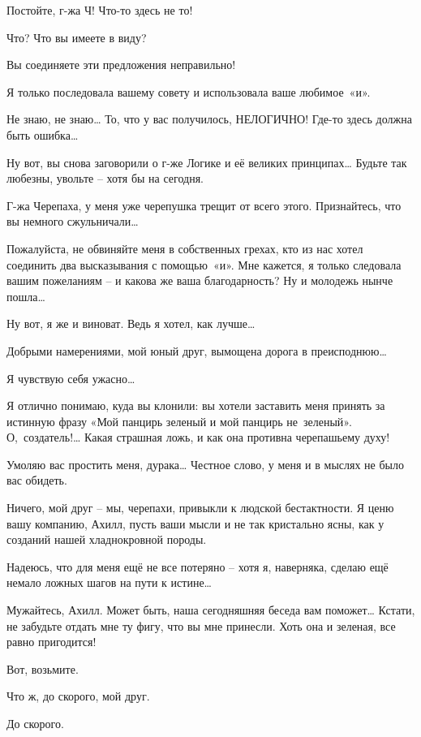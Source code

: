 \documentclass[../main.tex]{subfiles}
\begin{document}
\begin{dialogue}
 Постойте, г-жа Ч! Что-то здесь не то!

 Что? Что вы имеете в виду?

 Вы соединяете эти предложения неправильно!

 Я только последовала вашему совету и использовала ваше любимое~«и».

 Не знаю, не знаю\ldots{} То, что у вас получилось, НЕЛОГИЧНО! Где-то здесь должна быть ошибка\ldots{}

 Ну вот, вы снова заговорили о г-же Логике и её великих принципах\ldots{} Будьте так любезны, увольте \--- хотя бы на сегодня.

 Г-жа Черепаха, у меня уже черепушка трещит от всего этого. Признайтесь, что вы немного сжульничали\ldots{}

 Пожалуйста, не обвиняйте меня в собственных грехах, кто из нас хотел соединить два высказывания с помощью~«и». Мне кажется, я только следовала вашим пожеланиям \--- и какова же ваша благодарность? Ну и молодежь нынче пошла\ldots{}

 Ну вот, я же и виноват. Ведь я хотел, как лучше\ldots{}

 Добрыми намерениями, мой юный друг, вымощена дорога в преисподнюю\ldots{}

 Я чувствую себя ужасно\ldots{}

 Я отлично понимаю, куда вы клонили: вы хотели заставить меня принять за истинную фразу «Мой панцирь зеленый и мой панцирь не~зеленый». О,~создатель!\ldots{} Какая страшная ложь, и как она противна черепашьему духу!

 Умоляю вас простить меня, дурака\ldots{} Честное слово, у меня и в мыслях не было вас обидеть.

 Ничего, мой друг \--- мы, черепахи, привыкли к людской бестактности. Я ценю вашу компанию, Ахилл, пусть ваши мысли и не так кристально ясны, как у созданий нашей хладнокровной породы.

 Надеюсь, что для меня ещё не все потеряно \--- хотя я, наверняка, сделаю ещё немало ложных шагов на пути к истине\ldots{}

 Мужайтесь, Ахилл. Может быть, наша сегодняшняя беседа вам поможет\ldots{} Кстати, не забудьте отдать мне ту фигу, что вы мне принесли. Хоть она и зеленая, все равно пригодится!

 Вот, возьмите.

 Что ж, до скорого, мой друг.

 До скорого.

\end{dialogue}
\end{document}
